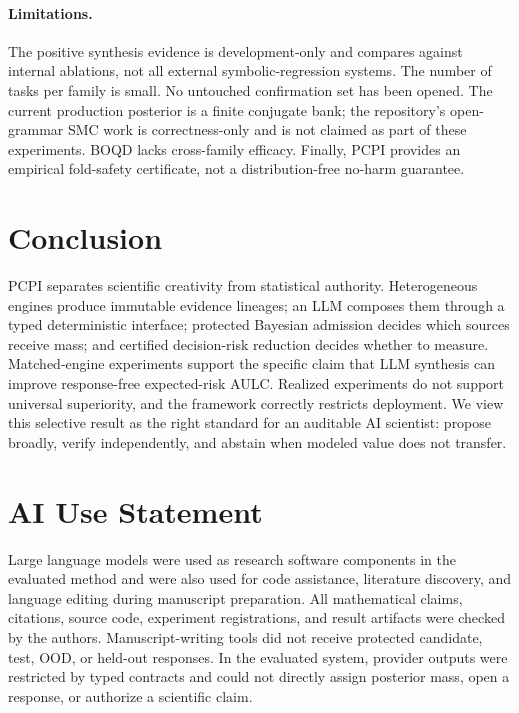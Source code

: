 \documentclass[twoside]{article}
\newcommand{\method}{PCPI}
\begin{document}
\paragraph{Limitations.}
The positive synthesis evidence is development-only and compares against
internal ablations, not all external symbolic-regression systems. The number
of tasks per family is small. No untouched confirmation set has been opened.
The current production posterior is a finite conjugate bank; the repository's
open-grammar SMC work is correctness-only and is not claimed as part of these
experiments. BOQD lacks cross-family efficacy. Finally, \method{} provides
an empirical fold-safety certificate, not a distribution-free no-harm
guarantee.

\section{Conclusion}

\method{} separates scientific creativity from statistical authority.
Heterogeneous engines produce immutable evidence lineages; an LLM composes
them through a typed deterministic interface; protected Bayesian admission
decides which sources receive mass; and certified decision-risk reduction
decides whether to measure. Matched-engine experiments support the specific
claim that LLM synthesis can improve response-free expected-risk AULC.
Realized experiments do not support universal superiority, and the framework
correctly restricts deployment. We view this selective result as the right
standard for an auditable AI scientist: propose broadly, verify independently,
and abstain when modeled value does not transfer.

\section*{AI Use Statement}

Large language models were used as research software components in the
evaluated method and were also used for code assistance, literature discovery,
and language editing during manuscript preparation. All mathematical claims,
citations, source code, experiment registrations, and result artifacts were
checked by the authors. Manuscript-writing tools did not receive protected
candidate, test, OOD, or held-out responses. In the evaluated system, provider
outputs were restricted by typed contracts and could not directly assign
posterior mass, open a response, or authorize a scientific claim.
\end{document}
